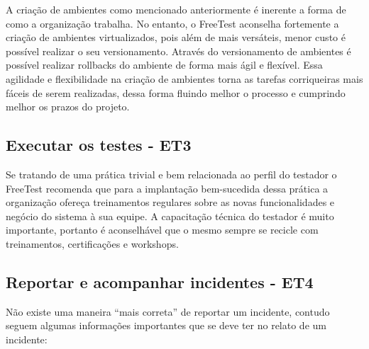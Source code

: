 A criação de ambientes como mencionado anteriormente é inerente a forma de como a organização trabalha. No entanto, o FreeTest aconselha fortemente a criação de ambientes virtualizados, pois além de mais versáteis, menor custo é possível realizar o seu versionamento. Através do versionamento de ambientes é possível realizar rollbacks do ambiente de forma mais ágil e flexível. Essa agilidade e flexibilidade na criação de ambientes torna as tarefas corriqueiras mais fáceis de serem realizadas, dessa forma fluindo melhor o processo e cumprindo melhor os prazos do projeto.


\subsection{Executar os testes - ET3}
\label{sec:guiaet3}

Se tratando de uma prática trivial e bem relacionada ao perfil do testador o FreeTest recomenda que para a implantação bem-sucedida dessa prática a organização ofereça treinamentos regulares sobre as novas funcionalidades e negócio do sistema à sua equipe. A capacitação técnica do testador é muito importante, portanto é aconselhável que o mesmo sempre se recicle com treinamentos, certificações e workshops.

\subsection{Reportar e acompanhar incidentes - ET4}
\label{sec:guiaet4}

Não existe uma maneira “mais correta” de reportar um incidente, contudo seguem algumas informações importantes que se deve ter no relato de um incidente:


